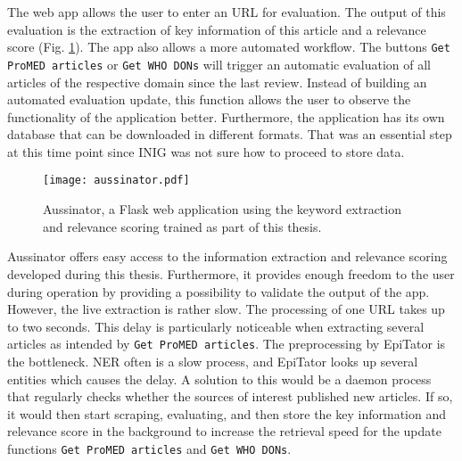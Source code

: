   The web app allows the user to enter an URL for evaluation.
  The output of this evaluation is the extraction of key information of this article and a relevance score  (Fig. \ref{fig:t-aussinator}).
  The app also allows a more automated workflow. The buttons \texttt{Get ProMED articles} or \texttt{Get WHO DONs} will trigger an automatic evaluation of all articles of the respective domain since the last review.
  Instead of building an automated evaluation update, this function allows the user to observe the functionality of the application better.
  Furthermore, the application has its own database that can be downloaded in different formats.
  That was an essential step at this time point since INIG was not sure how to proceed to store data.
  \begin{figure}[h!]
    \centering
    \texttt{[image: aussinator.pdf]}
    \caption{Aussinator, a Flask web application using the keyword extraction and relevance scoring trained as part of this thesis.}
  \label{fig:t-aussinator}
  \end{figure}

  Aussinator offers easy access to the information extraction and relevance scoring developed during this thesis. Furthermore, it provides enough freedom to the user during operation by providing a possibility to validate the output of the app.
  However, the live extraction is rather slow. The processing of one URL takes up to two seconds. This delay is particularly noticeable when extracting several articles as intended by \texttt{Get ProMED articles}.
  The preprocessing by EpiTator is the bottleneck.
  NER often is a slow process, and EpiTator looks up several entities which causes the delay.
  A solution to this would be a daemon process that regularly checks whether the sources of interest published new articles.
  If so, it would then start scraping, evaluating, and then store the key information and relevance score in the background to increase the retrieval speed for the update functions \texttt{Get ProMED articles} and \texttt{Get WHO DONs}.
